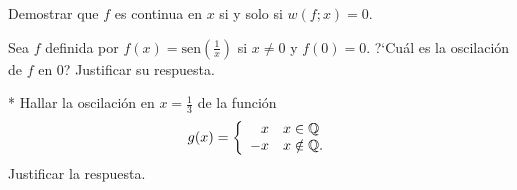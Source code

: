 \documentclass{book}
\newcommand{\qq}{\mathbb{Q}}
\begin{document}
\begin{ejer}{} Demostrar que 
$f$ es continua en $x$ si y solo si $w(f;x)=0$.



\end{ejer}

\begin{ejer}{} Sea $f$ definida por $f(x)=\text{sen} \left(\frac{1}{x}\right)$ si $x \neq 0$ y $f(0)=0$.
?`Cuál es la oscilación de $f$ en 0? Justificar su respuesta.

\end{ejer} 

\begin{ejer}{}* Hallar la oscilación en $x=\frac{1}{3}$ de la función 
\[
g(x)=\left\{
\begin{array}{r l}
x & x\in \qq
\\
-x & x\notin\qq.
\end{array}
\right.
\]
Justificar la respuesta.


\end{ejer} 


\end{document}

